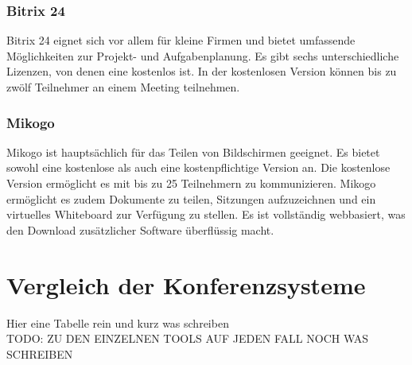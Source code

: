\subsubsection{Bitrix 24}
Bitrix 24 eignet sich vor allem für kleine Firmen und bietet umfassende Möglichkeiten zur Projekt- und Aufgabenplanung.
Es gibt sechs unterschiedliche Lizenzen, von denen eine kostenlos ist.
In der kostenlosen Version können bis zu zwölf Teilnehmer an einem Meeting teilnehmen.
\autocite[Vgl.][]{M_Straub.o.J.}

\subsubsection{Mikogo}
Mikogo ist hauptsächlich für das Teilen von Bildschirmen geeignet.
Es bietet sowohl eine kostenlose als auch eine kostenpflichtige Version an.
Die kostenlose Version ermöglicht es mit bis zu 25 Teilnehmern zu kommunizieren.
Mikogo ermöglicht es zudem Dokumente zu teilen, Sitzungen aufzuzeichnen und ein virtuelles Whiteboard zur Verfügung zu stellen.
Es ist vollständig webbasiert, was den Download zusätzlicher Software überflüssig macht.
\autocite[Vgl.][]{M_Straub.o.J.}

\section{Vergleich der Konferenzsysteme}
Hier eine Tabelle rein und kurz was schreiben\\
TODO: ZU DEN EINZELNEN TOOLS AUF JEDEN FALL NOCH WAS SCHREIBEN